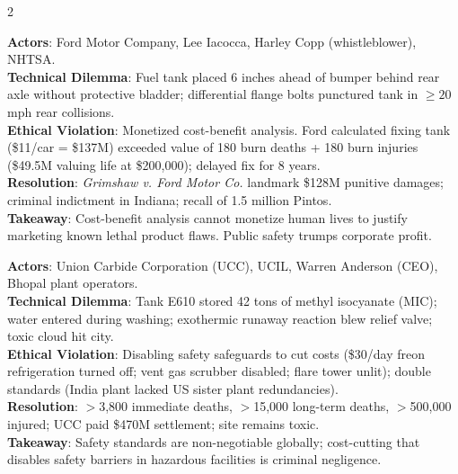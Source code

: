 \documentclass[9pt,a4paper]{extarticle}
\begin{document}
\begin{multicols}{2}
\begin{tcolorbox}[casebox,title={13. Ford Pinto Fuel Tank Fires (1971--1978)}]
\textbf{Actors}: Ford Motor Company, Lee Iacocca, Harley Copp (whistleblower), NHTSA.\\
\textbf{Technical Dilemma}: Fuel tank placed 6 inches ahead of bumper behind rear axle without protective bladder; differential flange bolts punctured tank in $\ge 20$ mph rear collisions.\\
\textbf{Ethical Violation}: Monetized cost-benefit analysis. Ford calculated fixing tank (\$11/car = \$137M) exceeded value of 180 burn deaths + 180 burn injuries (\$49.5M valuing life at \$200,000); delayed fix for 8 years.\\
\textbf{Resolution}: \textit{Grimshaw v. Ford Motor Co.} landmark \$128M punitive damages; criminal indictment in Indiana; recall of 1.5 million Pintos.\\
\textbf{Takeaway}: Cost-benefit analysis cannot monetize human lives to justify marketing known lethal product flaws. Public safety trumps corporate profit.
\end{tcolorbox}

\begin{tcolorbox}[casebox,title={14. Bhopal Chemical Disaster (1984)}]
\textbf{Actors}: Union Carbide Corporation (UCC), UCIL, Warren Anderson (CEO), Bhopal plant operators.\\
\textbf{Technical Dilemma}: Tank E610 stored 42 tons of methyl isocyanate (MIC); water entered during washing; exothermic runaway reaction blew relief valve; toxic cloud hit city.\\
\textbf{Ethical Violation}: Disabling safety safeguards to cut costs (\$30/day freon refrigeration turned off; vent gas scrubber disabled; flare tower unlit); double standards (India plant lacked US sister plant redundancies).\\
\textbf{Resolution}: $>$3,800 immediate deaths, $>$15,000 long-term deaths, $>$500,000 injured; UCC paid \$470M settlement; site remains toxic.\\
\textbf{Takeaway}: Safety standards are non-negotiable globally; cost-cutting that disables safety barriers in hazardous facilities is criminal negligence.
\end{tcolorbox}


\end{multicols}
\end{document}
